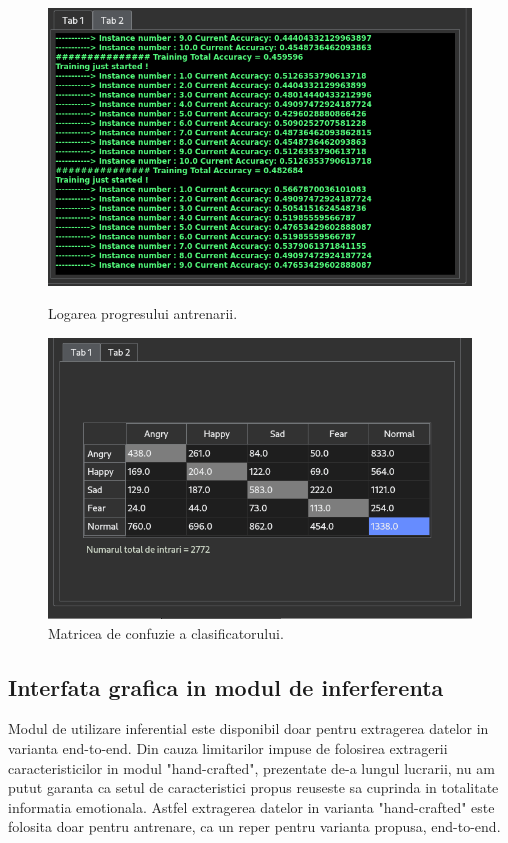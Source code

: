 \documentclass[a4paper,12pt]{book}
\begin{document}
		\begin{figure}[h]
			\hspace{-1.2cm}
			\begin{minipage}{0.48\textwidth}
				\centering
				\includegraphics[scale=0.40]{gui_train_logs}
				\caption{Logarea progresului antrenarii.}\label{Fig:gui_train_logs}
			\end{minipage}\hfill
		\hspace{1.9cm}
			\begin{minipage}{0.60\textwidth}
				\centering
				\includegraphics[scale=0.383]{gui_train_tabel}
				\caption{Matricea de confuzie a clasificatorului.}\label{Fig:gui_train_table}
			\end{minipage}
		\end{figure} 
		\subsection{Interfata grafica in modul de inferferenta}
		Modul de utilizare inferential este disponibil doar pentru extragerea datelor in varianta end-to-end. Din cauza limitarilor impuse de folosirea extragerii caracteristicilor in modul "hand-crafted", prezentate de-a lungul lucrarii, nu am putut garanta ca setul de caracteristici propus reuseste sa cuprinda in totalitate informatia emotionala. Astfel extragerea datelor in varianta "hand-crafted" este folosita doar pentru antrenare, ca un reper pentru varianta propusa, end-to-end. \par
\end{document}
